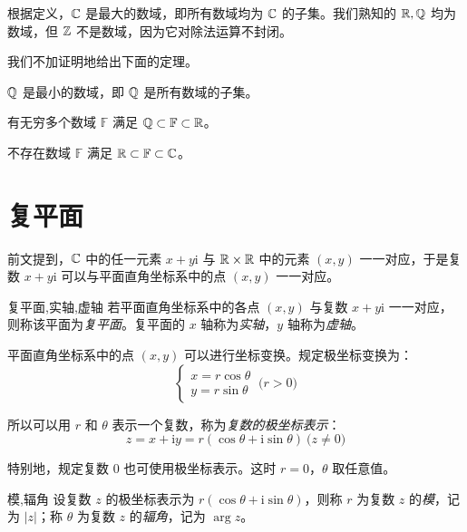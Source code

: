 根据定义，$\mathbb C$ 是最大的数域，即所有数域均为 $\mathbb C$ 的子集。我们熟知的 $\mathbb R, \mathbb Q$ 均为数域，但 $\mathbb Z$ 不是数域，因为它对除法运算不封闭。

我们不加证明地给出下面的定理。

\begin{theorem}
	$\mathbb Q$ 是最小的数域，即 $\mathbb Q$ 是所有数域的子集。
\end{theorem}

\begin{theorem}
	有无穷多个数域 $\mathbb F$ 满足 $\mathbb Q \subset \mathbb F \subset \mathbb R$。
\end{theorem}

\begin{theorem}
	不存在数域 $\mathbb F$ 满足 $\mathbb R \subset \mathbb F \subset \mathbb C$。
\end{theorem}

\section{复平面}

前文提到，$\mathbb C$ 中的任一元素 $x + y \mathrm i$ 与 $\mathbb R \times \mathbb R$ 中的元素 $(x, y)$ 一一对应，于是复数 $x + y \mathrm i$ 可以与平面直角坐标系中的点 $(x, y)$ 一一对应。

\begin{definition}{复平面,实轴,虚轴}
	若平面直角坐标系中的各点 $(x, y)$ 与复数 $x + y \mathrm i$ 一一对应，则称该平面为\emph{复平面}。复平面的 $x$ 轴称为\emph{实轴}，$y$ 轴称为\emph{虚轴}。
\end{definition}

平面直角坐标系中的点 $(x, y)$ 可以进行坐标变换。规定极坐标变换为：
$$
\begin{cases}
	x = r \cos \theta
	\\
	y = r \sin \theta
\end{cases}
\pod{r > 0}
$$

所以可以用 $r$ 和 $\theta$ 表示一个复数，称为\emph{复数的极坐标表示}：
$$
z = x + \mathrm i y = r (\cos \theta + \mathrm i \sin \theta) \pod{z \ne 0}
$$

特别地，规定复数 $0$ 也可使用极坐标表示。这时 $r = 0$，$\theta$ 取任意值。

\begin{definition}{模,辐角}
	设复数 $z$ 的极坐标表示为 $r (\cos \theta + \mathrm i \sin \theta)$，则称 $r$ 为复数 $z$ 的\emph{模}，记为 $|z|$；称 $\theta$ 为复数 $z$ 的\emph{辐角}，记为 $\arg z$。
\end{definition}


